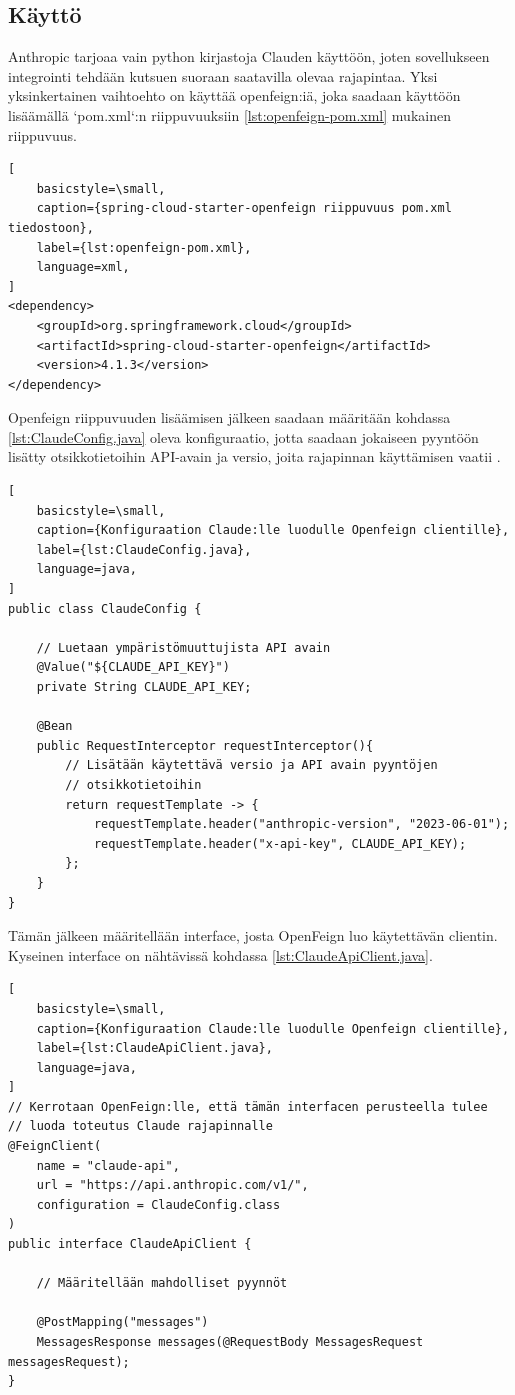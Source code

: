 \subsection{Käyttö}
\label{ch:claude-usage}

Anthropic tarjoaa vain python kirjastoja Clauden käyttöön, joten sovellukseen
integrointi tehdään kutsuen suoraan saatavilla olevaa rajapintaa. Yksi
yksinkertainen vaihtoehto on käyttää openfeign:iä, joka saadaan käyttöön
lisäämällä `pom.xml`:n riippuvuuksiin \ref{lst:openfeign-pom.xml} mukainen
riippuvuus.

\begin{lstlisting}[
    basicstyle=\small,
    caption={spring-cloud-starter-openfeign riippuvuus pom.xml tiedostoon},
    label={lst:openfeign-pom.xml},
    language=xml,
]
<dependency>
    <groupId>org.springframework.cloud</groupId>
    <artifactId>spring-cloud-starter-openfeign</artifactId>
    <version>4.1.3</version>
</dependency>
\end{lstlisting}

Openfeign riippuvuuden lisäämisen jälkeen saadaan määritään kohdassa
\ref{lst:ClaudeConfig.java} oleva konfiguraatio, jotta saadaan jokaiseen
pyyntöön lisätty otsikkotietoihin API-avain ja versio, joita rajapinnan
käyttämisen vaatii \parencite{anthropicAPIDocsVersions}
\parencite{anthropicAPIDocsGettingStarted}.

\begin{lstlisting}[
    basicstyle=\small,
    caption={Konfiguraation Claude:lle luodulle Openfeign clientille},
    label={lst:ClaudeConfig.java},
    language=java,
]
public class ClaudeConfig {

    // Luetaan ympäristömuuttujista API avain
    @Value("${CLAUDE_API_KEY}")
    private String CLAUDE_API_KEY;

    @Bean
    public RequestInterceptor requestInterceptor(){
        // Lisätään käytettävä versio ja API avain pyyntöjen
        // otsikkotietoihin
        return requestTemplate -> {
            requestTemplate.header("anthropic-version", "2023-06-01");
            requestTemplate.header("x-api-key", CLAUDE_API_KEY);
        };
    }
}
\end{lstlisting}

Tämän jälkeen määritellään interface, josta OpenFeign luo käytettävän clientin.
Kyseinen interface on nähtävissä kohdassa \ref{lst:ClaudeApiClient.java}.

\begin{lstlisting}[
    basicstyle=\small,
    caption={Konfiguraation Claude:lle luodulle Openfeign clientille},
    label={lst:ClaudeApiClient.java},
    language=java,
]
// Kerrotaan OpenFeign:lle, että tämän interfacen perusteella tulee
// luoda toteutus Claude rajapinnalle
@FeignClient(
    name = "claude-api",
    url = "https://api.anthropic.com/v1/",
    configuration = ClaudeConfig.class
)
public interface ClaudeApiClient {

    // Määritellään mahdolliset pyynnöt

    @PostMapping("messages")
    MessagesResponse messages(@RequestBody MessagesRequest messagesRequest);
}
\end{lstlisting}

